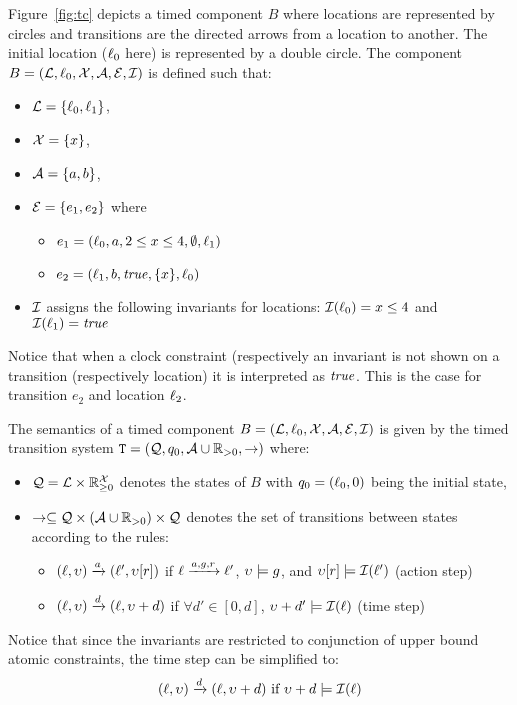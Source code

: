 \begin{example}
  Figure~\ref{fig:tc} depicts a timed component $B$ where locations
  are represented by circles and transitions are the directed arrows
  from a location to another. The initial location ($\ell_0$ here) is
  represented by a double circle. The component 
  $B=(\mathcal{L},\ell_0,\mathcal{X},\mathcal{A},\mathcal{E},\mathcal{I})$ is defined such that:
  \begin{itemize}
    \item $\mathcal{L}=\{\ell_0,\ell_1\}$,
    \item $\mathcal{X}=\{x\}$,
    \item $\mathcal{A}=\{a,b\}$,
    \item $\mathcal{E}=\{e_1,e_2\}$ where
      \begin{itemize}
        \item $e_1=(\ell_0,a,2\le x\le4,\emptyset,\ell_1)$
        \item $e_2=(\ell_1,b,\textnormal{\textit{true}},\{x\},\ell_0)$
      \end{itemize}
    \item $\mathcal{I}$ assigns the following invariants for locations: 
      $\mathcal{I}(\ell_0)=x\le4$ and $\mathcal{I}(\ell_1)=\textnormal{\textit{true}}$
  \end{itemize}
  Notice that when a clock constraint (respectively an invariant is not
  shown on a transition (respectively location) it is interpreted as $\textnormal{\textit{true}}$.
  This is the case for transition $e_2$ and location $\ell_2$.
\end{example}


\begin{definition}\label{def:std_sem}
The semantics of a timed component $B=(\mathcal{L},\ell_0,\mathcal{X},\mathcal{A},\mathcal{E},\mathcal{I})$ is given by the timed transition
  system $\texttt{T}=(\mathcal{Q},q_0,\mathcal{A}\cup\mathbb{R}_{> 0},\to)$ where:
  \begin{itemize}
    \item $\mathcal{Q}=\mathcal{L}\times\mathbb{R}_{\ge 0}^{\mathcal{X}}$ denotes the states
      of $B$ with $q_0=(\ell_0,0)$ being the initial state, 
    \item $\to\subseteq\mathcal{Q}\times(\mathcal{A}\cup\mathbb{R}_{> 0})\times\mathcal{Q}$
    denotes the set of transitions between states according to the rules:
  \begin{itemize}
    \item $(\ell,\upsilon)\xrightarrow{a}(\ell',\upsilon[r])$ if $\ell\xrightarrow{a,g,r}
      \ell'$, $\upsilon\models g$, and $\upsilon[r]\models\mathcal{I}(\ell')$
      (action step) 
    \item $(\ell,\upsilon)\xrightarrow{d}(\ell,\upsilon+d)$ if $\forall d'\in[0,d]$,
      $\upsilon+d'\models \mathcal{I}(\ell)$ (time step) 
  \end{itemize}
  \end{itemize}
\end{definition}
Notice that since the invariants are restricted to conjunction of upper bound
atomic constraints, the time step can be simplified to:
\begin{displaymath}
  (\ell,\upsilon)\xrightarrow{d}(\ell,\upsilon+d)\text{ if }\upsilon+d\models \mathcal{I}(\ell) 
\end{displaymath}

